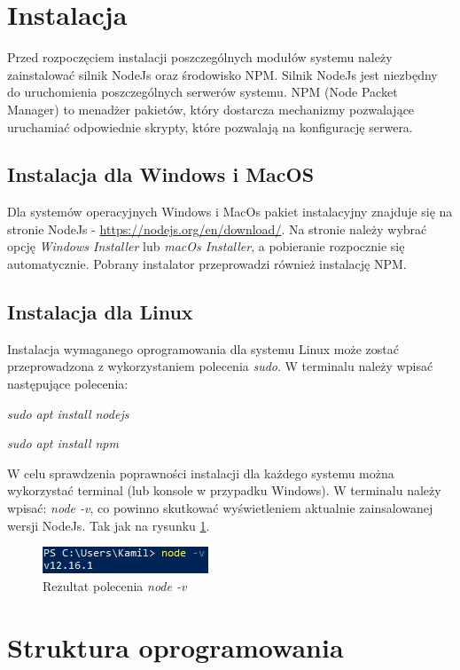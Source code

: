 \documentclass[a4paper,12pt]{book}
\begin{document}
\section{Instalacja}
Przed rozpoczęciem instalacji poszczególnych modułów systemu należy zainstalować silnik NodeJs oraz środowisko NPM. Silnik NodeJs jest niezbędny do uruchomienia poszczególnych serwerów systemu. NPM (Node Packet Manager) to menadżer pakietów, który dostarcza mechanizmy pozwalające uruchamiać odpowiednie skrypty, które pozwalają na konfigurację serwera. 

\subsection{Instalacja dla Windows i MacOS}
Dla systemów operacyjnych Windows i MacOs pakiet instalacyjny znajduje się na stronie NodeJs - \url{https://nodejs.org/en/download/}. Na stronie należy wybrać opcję \textit{Windows Installer} lub \textit{macOs Installer}, a pobieranie rozpocznie się automatycznie. Pobrany instalator przeprowadzi również instalację NPM.

\subsection{Instalacja dla Linux}
Instalacja wymaganego oprogramowania dla systemu Linux może zostać przeprowadzona z wykorzystaniem polecenia \textit{sudo}. W terminalu należy wpisać następujące polecenia: 

\textit{sudo apt install nodejs}

\textit{sudo apt install npm}

W celu sprawdzenia poprawności instalacji dla każdego systemu można wykorzystać terminal (lub konsole w przypadku Windows). W terminalu należy wpisać: \textit{node -v}, co powinno skutkować wyświetleniem aktualnie zainsalowanej wersji NodeJs. Tak jak na rysunku \ref{nodeversion}.
\begin{figure}[h]
	\centering
	\includegraphics[width=\textwidth]{images/node_version.png}
	\caption{Rezultat polecenia \textit{node -v}}\label{nodeversion}
\end {figure}

\section{Struktura oprogramowania}
\end{document}
